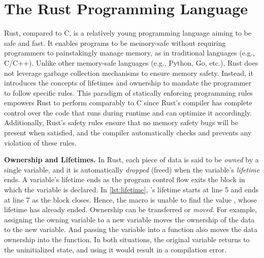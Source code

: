 
\section{The Rust Programming Language}
Rust, compared to C,
is a relatively young programming language aiming to be safe and fast.
It enables programs to be memory-safe without requiring programmers to
painstakingly manage memory, as in traditional languages (e.g., C/C++).
Unlike other memory-safe languages (e.g., Python, Go, etc.),
Rust does not leverage garbage collection mechanisms
to ensure memory safety.
Instead, it introduces the concepts of lifetimes and ownership
to mandate the programmer to follow specific rules.
This paradigm of statically enforcing programming rules
empowers Rust to perform comparably to C since Rust's compiler has complete
control over the code that
runs during runtime and can optimize it accordingly.
Additionally, Rust's safety rules ensure that
no memory safety bugs will be present when satisfied,
and the compiler automatically checks and prevents any violation of these rules.

\textbf{Ownership and Lifetimes.}
In Rust, each piece of data is said to be \textit{owned} by a single
variable, and it is automatically \textit{dropped} (freed) when the
variable's \textit{lifetime} ends. A variable's lifetime ends as the program
control flow exits the block in which the variable is declared.
In \autoref{lst:lifetime}, 's lifetime starts at line 5 and ends at
line 7 as the block closes. Hence, the  macro is unable to find
the value , whose lifetime has already ended.
Ownership can be transferred or \textit{moved}. For example,
assigning the owning variable to a new variable moves the ownership of the
data to the new variable. And passing the variable into a function also moves
the data ownership into the function.
In both situations, the original variable returns to the uninitialized state,
and using it would result in a compilation error.

